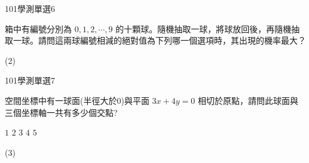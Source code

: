 \begin{QUESTIONS}
    \begin{QUESTION}
        \begin{ExamInfo}{101}{學測}{單選}{6}
        \end{ExamInfo}
        \begin{ExamAnsRateInfo}{66}{84}{71}{43}
        \end{ExamAnsRateInfo}
        \begin{QBODY}
            箱中有編號分別為 $0,1, 2, \cdots ,9$   的十顆球。隨機抽取一球，將球放回後，再隨機抽取一球。請問這兩球編號相減的絕對值為下列哪一個選項時，其出現的機率最大？
			\begin{QOPS}
			\end{QOPS}
        \end{QBODY}
        \begin{QFROMS}
        \end{QFROMS}
        \begin{QTAGS}\end{QTAGS}
        \begin{QANS}
            (2)
        \end{QANS}
        \begin{QSOLLIST}
        \end{QSOLLIST}
        \begin{QEMPTYSPACE}
        \end{QEMPTYSPACE}
    \end{QUESTION}
    \begin{QUESTION}
        \begin{ExamInfo}{101}{學測}{單選}{7}
        \end{ExamInfo}
        \begin{ExamAnsRateInfo}{37}{45}{34}{32}
        \end{ExamAnsRateInfo}
        \begin{QBODY}
            空間坐標中有一球面(半徑大於0)與平面 $3x+4y=0$ 相切於原點，請問此球面與三個坐標軸一共有多少個交點? 
			\begin{QOPS} 
				\QOP $1$ 
				\QOP $2$ 
				\QOP $3$ 
				\QOP $4$ 
				\QOP $5$
			\end{QOPS}
        \end{QBODY}
        \begin{QFROMS}
        \end{QFROMS}
        \begin{QTAGS}\end{QTAGS}
        \begin{QANS}
            (3)
        \end{QANS}
        \begin{QSOLLIST}
        \end{QSOLLIST}
        \begin{QEMPTYSPACE}
        \end{QEMPTYSPACE}
    \end{QUESTION}
\end{QUESTIONS}
